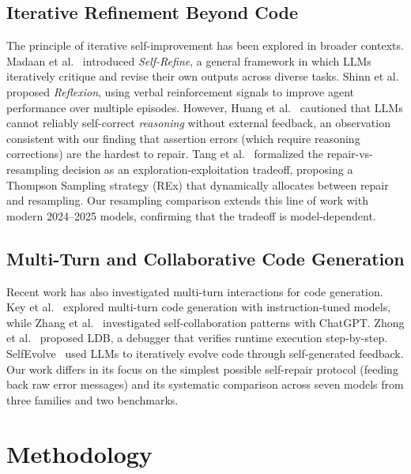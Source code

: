 \documentclass[conference]{IEEEtran}
\begin{document}
\subsection{Iterative Refinement Beyond Code}

The principle of iterative self-improvement has been explored in broader contexts. Madaan et al.~\cite{madaan2023selfrefine} introduced \emph{Self-Refine}, a general framework in which LLMs iteratively critique and revise their own outputs across diverse tasks. Shinn et al.~\cite{shinn2023reflexion} proposed \emph{Reflexion}, using verbal reinforcement signals to improve agent performance over multiple episodes. However, Huang et al.~\cite{huang2024large} cautioned that LLMs cannot reliably self-correct \emph{reasoning} without external feedback, an observation consistent with our finding that assertion errors (which require reasoning corrections) are the hardest to repair. Tang et al.~\cite{tang2024repair} formalized the repair-vs-resampling decision as an exploration-exploitation tradeoff, proposing a Thompson Sampling strategy (REx) that dynamically allocates between repair and resampling. Our resampling comparison extends this line of work with modern 2024--2025 models, confirming that the tradeoff is model-dependent.

\subsection{Multi-Turn and Collaborative Code Generation}

Recent work has also investigated multi-turn interactions for code generation. Key et al.~\cite{key2024multiturn} explored multi-turn code generation with instruction-tuned models, while Zhang et al.~\cite{zhang2023selfcollaboration} investigated self-collaboration patterns with ChatGPT. Zhong et al.~\cite{zhong2024ldb} proposed LDB, a debugger that verifies runtime execution step-by-step. SelfEvolve~\cite{jiang2023selfevolve} used LLMs to iteratively evolve code through self-generated feedback. Our work differs in its focus on the simplest possible self-repair protocol (feeding back raw error messages) and its systematic comparison across seven models from three families and two benchmarks.

\section{Methodology}
\label{sec:methodology}
\end{document}
